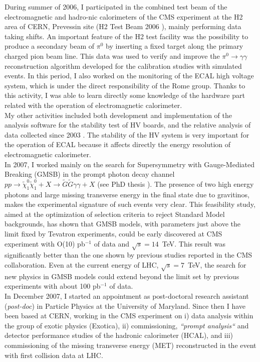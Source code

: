 \documentclass[10pt, a4paper]{article}
\begin{document}
During summer of 2006, I participated in the combined test beam of the electromagnetic and 
hadro-nic calorimeters of the CMS experiment at the H2 area of CERN, Prevessin site 
(H2 Test Beam 2006 \cite{Abdullin:2009zz}), mainly performing data taking shifts.
An important feature of the H2 test facility was the possibility to produce a secondary beam
of $\pi^0$ by inserting a fixed target along the primary charged pion beam line. 
This data \cite{Adzic:2008zza} was used to verify and improve the $\pi^0 \rightarrow \gamma\gamma$ 
reconstruction algorithm developed for the calibration studies with simulated events.
In this period, I also worked on the monitoring of the ECAL high voltage system, which is 
under the direct responsibility of the Rome group. Thanks to this activity, I was able to learn directly 
some knowledge of the hardware part related with the operation of electromagnetic calorimeter. \\

My other activities included both development and implementation of the analysis software for the 
stability test of HV boards, and the relative analysis of data collected since 2003 \cite{Bartoloni:2007hx}. 
The stability of the HV system is very important for the operation of ECAL because it affects directly 
the energy resolution of electromagnetic calorimeter. \\

In 2007, I worked mainly on the search for Supersymmetry 
with Gauge-Mediated Breaking (GMSB) in the prompt photon decay channel 
$pp \rightarrow \tilde{\chi}_1^0 \tilde{\chi}_1^0 + X \rightarrow \tilde{G} \tilde{G} \gamma \gamma + X$ 
(see PhD thesis \cite{Santanastasio:DOTTORATO}). 
The presence of two high energy photons and large missing transverse energy
in the final state due to gravitinos, makes the experimental signature of such events very clear.
This feasibility study, aimed at the optimization of selection criteria to reject Standard Model backgrounds, 
has shown that GMSB models, with parameters just above the limit fixed by Tevatron experiments, 
could be early discovered at CMS experiment with O(10) pb$^{-1}$ of data and $\sqrt{s}=14$~TeV. 
This result was significantly better than the one shown by previous studies reported in the CMS collaboration.
Even at the current energy of LHC, $\sqrt{s}=7$~TeV, the search for new physics in GMSB models 
could extend beyond the limit set by previous experiments with about 100 pb$^{-1}$ of data. \\

In December 2007, I started an appointment as post-doctoral research 
assistant ({\it post-doc}) in Particle Physics at the University of Maryland. 
Since then I have been based at CERN, working in the CMS experiment on 
i) data analysis within the group of exotic physics (Exotica), 
ii) commissioning, {\it``prompt analysis``} and detector performance studies 
of the hadronic calorimeter (HCAL), and 
iii) commissioning of the missing transverse energy (MET) reconstructed in the event 
with first collision data at LHC. \\
\end{document}
